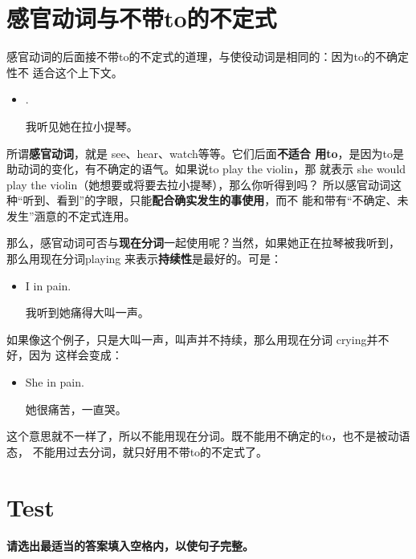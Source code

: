 \section{感官动词与不带to的不定式}

感官动词的后面接不带to的不定式的道理，与使役动词是相同的：因为to的不确定性不
适合这个上下文。

\begin{itemize}
\item {}   .

  我听见她在拉小提琴。
\end{itemize}

所谓\textbf{感官动词}，就是 see、hear、watch等等。它们后面\textbf{不适合
  用to}，是因为to是助动词的变化，有不确定的语气。如果说to play the violin，那
就表示 she would play the violin（她想要或将要去拉小提琴），那么你听得到吗？
所以感官动词这种“听到、看到”的字眼，只能\textbf{配合确实发生的事使用}，而不
能和带有“不确定、未发生”涵意的不定式连用。

那么，感官动词可否与\textbf{现在分词}一起使用呢？当然，如果她正在拉琴被我听到，
那么用现在分词playing 来表示\textbf{持续性}是最好的。可是：
\begin{itemize}
\item  I  in pain.

  我听到她痛得大叫一声。
\end{itemize}

如果像这个例子，只是大叫一声，叫声并不持续，那么用现在分词 crying并不好，因为
这样会变成：
\begin{itemize}
\item She  in pain.

  她很痛苦，一直哭。
\end{itemize}
这个意思就不一样了，所以不能用现在分词。既不能用不确定的to，也不是被动语态，
不能用过去分词，就只好用不带to的不定式了。


\section{Test}

\paragraph{请选出最适当的答案填入空格内，以使句子完整。}

